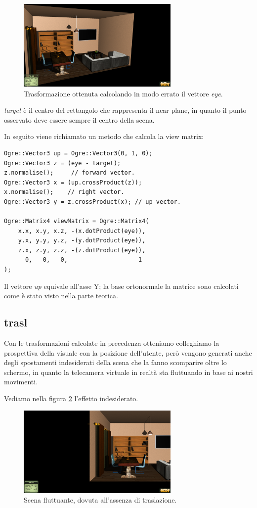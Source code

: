 \begin{figure}[htbp]
\centering
\includegraphics[width=0.7\textwidth]{images/progetto/ogre-wrong.png}
\caption{Trasformazione ottenuta calcolando in modo errato il vettore \textit{eye}.\label{wrong-eye}}
\end{figure}


\textit{target} è il centro del rettangolo che rappresenta il near plane, in quanto il punto osservato deve essere sempre il centro della scena.

In seguito viene richiamato un metodo che calcola la view matrix:
\begin{lstlisting}
Ogre::Vector3 up = Ogre::Vector3(0, 1, 0);
Ogre::Vector3 z = (eye - target); 
z.normalise();     // forward vector.
Ogre::Vector3 x = (up.crossProduct(z)); 
x.normalise();    // right vector.
Ogre::Vector3 y = z.crossProduct(x); // up vector.
 
Ogre::Matrix4 viewMatrix = Ogre::Matrix4(
    x.x, x.y, x.z, -(x.dotProduct(eye)),
    y.x, y.y, y.z, -(y.dotProduct(eye)),
    z.x, z.y, z.z, -(z.dotProduct(eye)),
      0,   0,   0,                    1
);
\end{lstlisting}
Il vettore \textit{up} equivale all'asse Y; la base ortonormale la matrice sono calcolati come è stato visto nella parte teorica.


\subsection{trasl} 
Con le trasformazioni calcolate in precedenza otteniamo colleghiamo la prospettiva della visuale con la posizione dell'utente, però vengono generati anche degli spostamenti indesiderati della scena che la fanno scomparire oltre lo schermo, in quanto la telecamera virtuale in realtà sta fluttuando in base ai nostri movimenti.

Vediamo nella figura \ref{no-transl} l'effetto indesiderato.

\begin{figure}[htbp]
\centering
\includegraphics[width=0.7\textwidth]{images/progetto/ogre-transl.png}
\caption{Scena fluttuante, dovuta all'assenza di traslazione.\label{no-transl}}
\end{figure}

